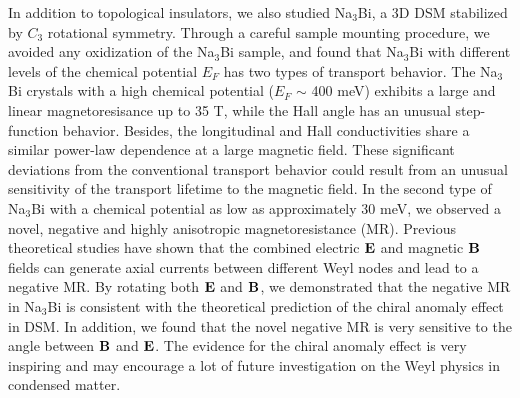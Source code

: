 In addition to topological insulators, we also studied Na$_3$Bi, a 3D DSM stabilized by $C_3$ rotational symmetry. Through a careful sample mounting procedure, we avoided any oxidization of the Na$_3$Bi sample, and found that Na$_3$Bi with different levels of the chemical potential $E_F$ has two types of transport behavior. The Na$_3$Bi crystals with a high chemical potential ($E_F$ $\sim$ 400 meV) exhibits a large and linear magnetoresisance up to 35 T, while the Hall angle has an unusual step-function behavior. Besides, the longitudinal and Hall conductivities share a similar power-law dependence at a large magnetic field. These significant deviations from the conventional transport behavior could result from an unusual sensitivity of the transport lifetime to the magnetic field. In the second type of Na$_3$Bi with a chemical potential as low as approximately 30 meV, we observed a novel, negative and highly anisotropic magnetoresistance (MR). Previous theoretical studies have shown that the combined electric $\bf E$ and magnetic $\bf B$ fields can generate axial currents between different Weyl nodes and lead to a negative MR. By rotating both $\bf E$ and $\bf B$, we demonstrated that the negative MR in Na$_3$Bi is consistent with the theoretical prediction of the chiral anomaly effect in DSM. In addition, we found that the novel negative MR is very sensitive to the angle between $\bf B$ and $\bf E$. The evidence for the chiral anomaly effect is very inspiring and may encourage a lot of future investigation on the Weyl physics in condensed matter.